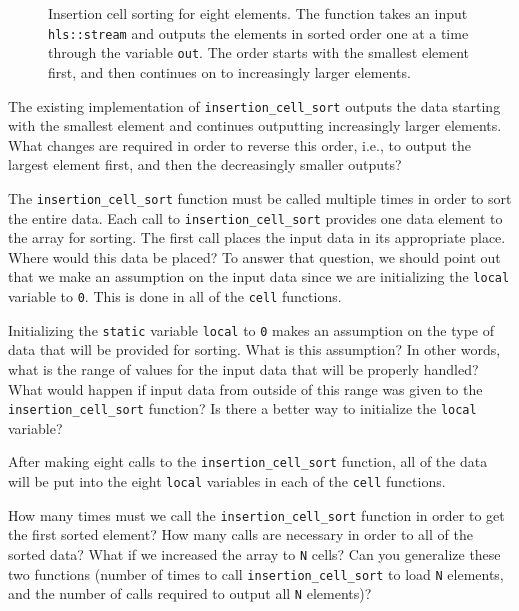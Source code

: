 \begin{figure}

\caption{  Insertion cell sorting for eight elements. The function takes an input \lstinline{hls::stream} and outputs the elements in sorted order one at a time through the variable \lstinline{out}. The order starts with the smallest element first, and then continues on to increasingly larger elements. }
\label{fig:partial_insertion_cell_sort.cpp}
\end{figure}

\begin{exercise}
The existing implementation of \lstinline{insertion_cell_sort} outputs the data starting with the smallest element and continues outputting increasingly larger elements. What changes are required in order to reverse this order, i.e., to output the largest element first, and then the decreasingly smaller outputs? 
\end{exercise}

The \lstinline{insertion_cell_sort} function must be called multiple times in order to sort the entire data. Each call to \lstinline{insertion_cell_sort} provides one data element to the array for sorting. The first call places the input data in its appropriate place. Where would this data be placed? To answer that question, we should point out that we make an assumption on the input data since we are initializing the \lstinline{local} variable to \lstinline{0}. This is done in all of the \lstinline{cell} functions.

\begin{exercise}
Initializing the \lstinline{static} variable \lstinline{local} to \lstinline{0} makes an assumption on the type of data that will be provided for sorting. What is this assumption? In other words, what is the range of values for the input data that will be properly handled? What would happen if input data from outside of this range was given to the \lstinline{insertion_cell_sort} function? Is there a better way to initialize the \lstinline{local} variable?
\end{exercise}

After making eight calls to the \lstinline{insertion_cell_sort} function, all of the data will be put into the eight \lstinline{local} variables in each of the \lstinline{cell} functions. 

\begin{exercise}
How many times must we call the \lstinline{insertion_cell_sort} function in order to get the first sorted element? How many calls are necessary in order to all of the sorted data? What if we increased the array to \lstinline{N} cells? Can you generalize these two functions (number of times to call \lstinline{insertion_cell_sort} to load \lstinline{N} elements, and the number of calls required to output all \lstinline{N} elements)?
\end{exercise}


